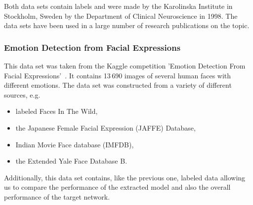 \documentclass[a4paper,11pt]{article}
\begin{document}
            Both data sets contain labels and were made by the Karolinska Institute in Stockholm, Sweden by the Department of Clinical Neuroscience in 1998. The data sets have been used in a large number of research publications on the topic. 
            
        \subsubsection{Emotion Detection from Facial Expressions}
            This data set was taken from the Kaggle competition 'Emotion Detection From Facial Expressions'~\cite{kaggle-emotion}. 
            It contains 13\,690 images of several human faces with different emotions. The data set was constructed from a variety of different sources, e.g.
            \begin{itemize}
                \item labeled Faces In The Wild,
                \item the Japanese Female Facial Expression (JAFFE) Database,
                \item Indian Movie Face database (IMFDB),
                \item the Extended Yale Face Database B.
            \end{itemize}
            
            Additionally, this data set contains, like the previous one, labeled data allowing us to compare the performance of the extracted model and also the overall performance of the target network.
    
\end{document}
